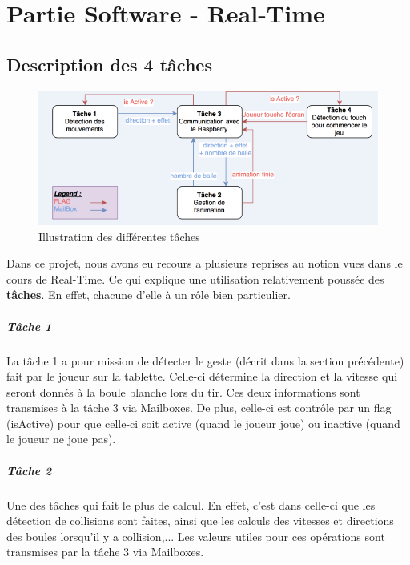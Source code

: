 \chapter{Partie Software - Real-Time}

\section{Description des 4 tâches}

\begin{figure}[!ht]
\centering
\includegraphics[scale=0.7]{img/task.png}
\caption{Illustration des différentes tâches}
\label{fig8}
\end{figure}

Dans ce projet, nous avons eu recours a plusieurs reprises au notion vues dans le cours de Real-Time. Ce qui explique une utilisation relativement poussée des \textbf{tâches}. En effet, chacune d'elle à un rôle bien particulier.

\paragraph{Tâche 1}

La tâche 1 a pour mission de détecter le geste (décrit dans la section précédente) fait par le joueur sur la tablette. Celle-ci détermine la direction et la vitesse qui seront donnés à la boule blanche lors du tir. Ces deux informations sont transmises à la tâche 3 via Mailboxes. De plus, celle-ci est contrôle par un flag (isActive) pour que celle-ci soit active (quand le joueur joue) ou inactive (quand le joueur ne joue pas).

\paragraph{Tâche 2}

Une des tâches qui fait le plus de calcul. En effet, c'est dans celle-ci que les détection de collisions sont faites, ainsi que les calculs des vitesses et directions des boules lorsqu'il y a collision,... Les valeurs utiles pour ces opérations sont transmises par la tâche 3 via Mailboxes. 

